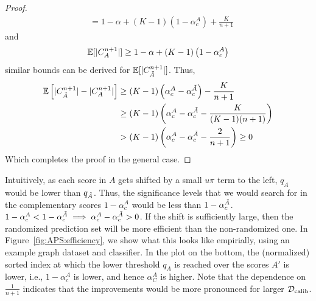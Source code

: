 \begin{proof}
\begin{align*}
     &= 1 - \alpha + (K-1)\left( 1 - \alpha_c^A\right) + \frac{K}{n+1}
\end{align*}
and 
\[
    \mathbb{E}[\lvert C_{A}^{n+1}\rvert] \geq 1 - \alpha + (K-1)\left(1 - \alpha_c^A\right)
\]
similar bounds can be derived for $\mathbb{E}[\lvert C_{\Tilde{A}}^{n+1}\rvert]$.
Thus, 
\begin{align*}
    \mathbb{E}\left[|C_{\Tilde{A}}^{n+1}| - |C_{A}^{n+1}|\right] &\geq (K-1)\left(\alpha_c^A - \alpha_c^{\Tilde{A}}\right) - \frac{K}{n+1} \\
    &\geq (K-1) \left(\alpha_c^A - \alpha_c^{\Tilde{A}} - \frac{K}{(K-1)(n+1)}\right)\\
    & >  (K-1)\left(\alpha_c^A - \alpha_c^{\Tilde{A}} - \frac{2}{n+1}\right) \geq 0
\end{align*}
Which completes the proof in the general case.

\end{proof}
Intuitively, as each score in $A$ gets shifted by a small $u\pi$ term to the left, $q_A$ would be lower than $q_{\Tilde{A}}$.
Thus, the significance levels that we would search for in the complementary scores $1-\alpha_c^A$ would be less than $1-\alpha_c^{\Tilde{A}}$.
$1 - \alpha_c^A < 1 - \alpha_c^{\Tilde{A}} \implies \alpha_c^A - \alpha_c^{\Tilde{A}} > 0$.
If the shift is sufficiently large, then the randomized prediction set will be more efficient than the non-randomized one.
In Figure~\ref{fig:APS:efficiency}, we show what this looks like empirially, using an example graph dataset and classifier.
In the plot on the bottom, the (normalized) sorted index at which the lower threshold $q_A$ is reached over the scores $A'$ is lower, i.e., $1 - \alpha_c^A$ is lower, and hence $\alpha_C^A$ is higher.
Note that the dependence on $\frac{1}{n+1}$ indicates that the improvements would be more pronounced for larger $\mathcal{D_{\mathrm{calib}}}$.

